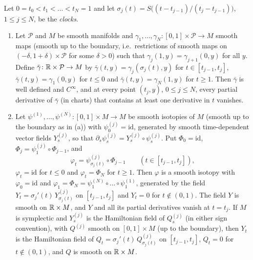 \begin{lemma}\label{lem:pre-concat}
Let $0=t_0<t_1<\dots<t_N=1$ and let $\sigma_j(t)=S\big((t-t_{j-1})/(t_j-t_{j-1})\big)$, $1\le j\le N$, be the
\emph{clocks}.
\begin{enumerate}[label=(\alph*)]
\item Let $\mathcal P$ and $M$ be smooth manifolds and $\gamma_1,\dots,\gamma_N\colon[0,1]\times\mathcal P\to M$ smooth maps
(smooth up to the boundary, i.e.\ restrictions of smooth maps on $(-\delta,1+\delta)\times\mathcal P$ for some $\delta>0$)
such that $\gamma_j(1,y)=\gamma_{j+1}(0,y)$ for all $y$. Define $\bar\gamma\colon\mathbb{R}\times\mathcal P\to M$ by
$\bar\gamma(t,y)=\gamma_j(\sigma_j(t),y)$ for $t\in[t_{j-1},t_j]$, $\bar\gamma(t,y)=\gamma_1(0,y)$ for $t\le0$ and
$\bar\gamma(t,y)=\gamma_N(1,y)$ for $t\ge1$. Then $\bar\gamma$ is well defined and $C^\infty$, and at every point
$(t_j,y)$, $0\le j\le N$, every partial derivative of $\bar\gamma$ (in charts) that contains at least one derivative in
$t$ vanishes.
\item Let $\psi^{(1)},\dots,\psi^{(N)}\colon[0,1]\times M\to M$ be smooth isotopies of $M$ (smooth up to the boundary as in
(a)) with $\psi^{(j)}_0=\mathrm{id}$, generated by smooth time-dependent vector fields $Y^{(j)}_s$, so that
$\partial_s\psi^{(j)}_s=Y^{(j)}_s\circ\psi^{(j)}_s$. Put $\Phi_0=\mathrm{id}$, $\Phi_j=\psi^{(j)}_1\circ\Phi_{j-1}$, and
\[
 \varphi_t=\psi^{(j)}_{\sigma_j(t)}\circ\Phi_{j-1}\qquad(t\in[t_{j-1},t_j]),
\]
$\varphi_t=\mathrm{id}$ for $t\le0$ and $\varphi_t=\Phi_N$ for $t\ge1$. Then $\varphi$ is a smooth isotopy with
$\varphi_0=\mathrm{id}$ and $\varphi_1=\Phi_N=\psi^{(N)}_1\circ\dots\circ\psi^{(1)}_1$, generated by the field
$Y_t=\sigma_j'(t)\,Y^{(j)}_{\sigma_j(t)}$ on $[t_{j-1},t_j]$ and $Y_t=0$ for $t\notin(0,1)$. The field $Y$ is smooth on
$\mathbb{R}\times M$, and $Y$ and all its partial derivatives vanish at $t=t_j$. If $M$ is symplectic and
$Y^{(j)}_s$ is the Hamiltonian field of $Q^{(j)}_s$ (in either sign convention), with $Q^{(j)}$ smooth on $[0,1]\times M$
(up to the boundary), then $Y_t$ is the Hamiltonian field of $Q_t=\sigma_j'(t)\,Q^{(j)}_{\sigma_j(t)}$ on $[t_{j-1},t_j]$,
$Q_t=0$ for $t\notin(0,1)$, and $Q$ is smooth on $\mathbb{R}\times M$.
\end{enumerate}
\end{lemma}


